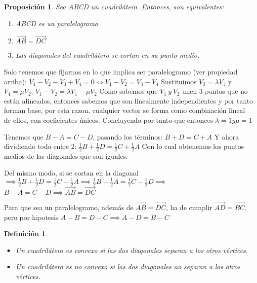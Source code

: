 \documentclass[11pt, a4paper, titlepage]{article}
\makeatletter
\renewenvironment{proof}[1][\proofname] {\vspace{-15pt}\par\pushQED{\qed}\normalfont\topsep6\p@\@plus6\p@\relax\trivlist\item[\hskip\labelsep\it#1\@addpunct{.}]\ignorespaces}{\popQED\endtrivlist\@endpefalse}
\renewcommand{\vec}{\overrightarrow}
\theoremstyle{theorem-style}
\newtheorem*{nprop}{Proposición}
\theoremstyle{definition-style}
\newtheorem*{ndef}{Definición}
\theoremstyle{remark-style}
\theoremstyle{example-style}
\newenvironment{nlist}
{\begin{enumerate}
    \renewcommand\labelenumi{(\emph{\roman{enumi})}}}
  {\end{enumerate}}
\makeatother
\begin{document}
\begin{nprop}
  Sea ABCD un cuadrilátero. Entonces, son equivalentes:
  \begin{nlist}
  \item ABCD es un paralelogramo
  \item $\vec{AB} = \vec{DC}$
  \item Las diagonales del cuadrilátero se cortan en su punto medio.
  \end{nlist}
\end{nprop}


\begin{proof}\hfill
  Solo tenemos que fijarnos en lo que implica ser paralelogramo (ver propiedad arriba):
  $V_{1} - V_{2} - V_{3} + V_{4} = 0 \Leftrightarrow V_{1} - V_{2} = V_{3} - V_{4} $
  Sustituimos $V_{3} = \lambda V_{1}$ y $V_{4} = \mu V_{2}$:
  $V_{1} - V_{2} = \lambda V_{1} - \mu V_{2}$
  Como sabemos que $V_{1}\ y\ V_{2}$ unen 3 puntos que no están alineados, entonces sabemos que son linealmente independientes y por
  tanto forman base, por esta razon, cualquier vector se forma como combinación lineal de ellos, con coeficientes únicos.
  Concluyendo por tanto que entonces $\lambda = 1 y \mu = 1$

  Tenemos que $B - A = C - D$, pasando los términos:
  $B + D = C + A$
  Y ahora dividiendo todo entre 2:
  $\frac{1}{2}B + \frac{1}{2}D = \frac{1}{2}C + \frac{1}{2}A$
  Con lo cual obtenemos los puntos medios de las diagonales que son iguales.

   Del mismo modo, si se cortan en la diagonal 
  $\implies \frac{1}{2}B + \frac{1}{2}D = \frac{1}{2}C + \frac{1}{2}A \implies 
  \frac{1}{2}B - \frac{1}{2}A = \frac{1}{2}C - \frac{1}{2}D \implies $ $B - A = C - D \implies \vec{AB} = \vec{DC}$
  
   Para que sea un paralelogramo, además de $\vec{AB} = \vec{DC}$, ha de cumplir $\vec{AD} = \vec{BC}$, pero por hipotesis $A - B = D - C \implies A - D = B - C$
  
\end{proof}

\begin{ndef}
  \begin{itemize}
  \item Un cuadrilátero es convexo si las dos diagonales separan a los otros vértices.\\
  \item Un cuadrilátero es no convexo si las dos diagonales no separan a los otros vértices.
  \end{itemize}
\end{ndef}
\end{document}
